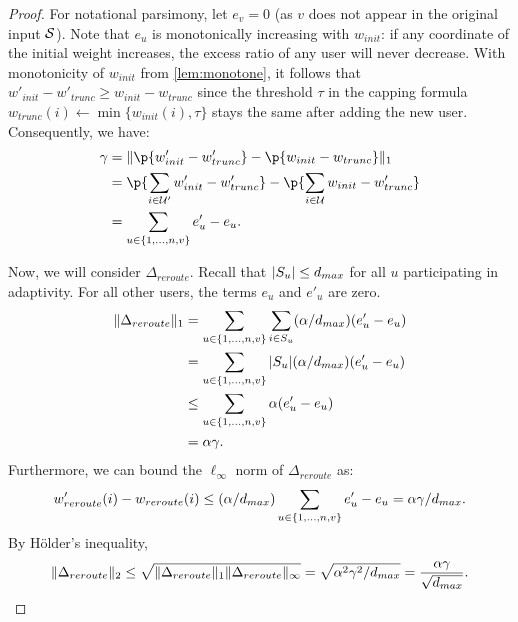 \begin{proof}
For notational parsimony, let $e_v = 0$ (as $v$ does not appear in the original input $\mathcal{S}$).
Note that $e_u$ is monotonically increasing with $w_{init}$: if any coordinate of the initial weight increases, the excess ratio of any user will never decrease.
With monotonicity of $w_{init}$ from \cref{lem:monotone}, it follows that $w'_{init} - w'_{trunc} \geq w_{init} - w_{trunc}$ since the threshold $\tau$ in the capping formula  $w_{trunc}(i) \gets \min\{w_{init}(i), \tau\}$ stays the same after adding the new user. Consequently, we have:
\begin{align*}
    \gamma
    &= \|\p{w'_{init} - w'_{trunc}} - \p{w_{init} - w_{trunc}}\|_1 \\
    &= \p{\sum_{i \in \U'} w'_{init} - w'_{trunc}} - \p{\sum_{i \in \U} w_{init} - w'_{trunc}} \\
    &= \sum_{u \in \{1, \ldots, n, v\}} e'_u - e_u.
\end{align*}

Now, we will consider $\Delta_{reroute}$.
Recall that $|S_u| \leq d_{max}$ for all $u$ participating in adaptivity. For all other users, the terms $e_u$ and $e'_u$ are zero.
\begin{align*}
    \|\Delta_{reroute}\|_1 &= \sum_{u \in \{1, \ldots, n, v\}} \sum_{i \in S_u} (\alpha / d_{max}) (e'_u - e_u) \\
    &= \sum_{u \in \{1, \ldots, n, v\}} |S_u| (\alpha / d_{max}) (e'_u - e_u) \\
    &\leq \sum_{u \in \{1, \ldots, n, v\}} \alpha(e'_u - e_u) \\
    &= \alpha \gamma.
\end{align*}
Furthermore, we can bound the $\ell_\infty$ norm of $\Delta_{reroute}$ as:
\begin{equation*}
    w'_{reroute}(i) - w_{reroute}(i) \leq (\alpha / d_{max}) \sum_{u \in \{1, \ldots, n, v\}} e'_u - e_u = \alpha \gamma / d_{max}.
\end{equation*}
By H\"older's inequality,
\begin{equation}\label{eq:reroute-l2}
    \|\Delta_{reroute}\|_2 \leq \sqrt{\|\Delta_{reroute}\|_1 \|\Delta_{reroute}\|_\infty}
    = \sqrt{\alpha^2 \gamma^2 / d_{max}} = \frac{\alpha \gamma}{\sqrt{d_{max}}}.
\end{equation}




\end{proof}
